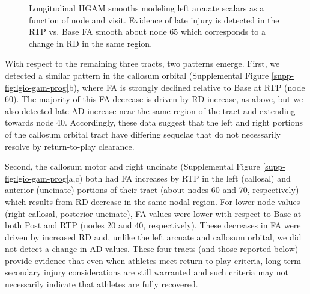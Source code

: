 \documentclass[12pt]{article}
\begin{document}
\begin{figure}[H]
	\centering
	\caption{Longitudinal HGAM smooths modeling left arcuate scalars as a function of node and visit. Evidence of late injury is detected in the RTP vs. Base FA smooth about node 65 which corresponds to a change in RD in the same region.}
	\label{fig:lgio-gam-prog}
\end{figure}

With respect to the remaining three tracts, two patterns emerge. First, we detected a similar pattern in the callosum orbital (Supplemental Figure \ref{supp-fig:lgio-gam-prog}b), where FA is strongly declined relative to Base at RTP (node 60). The majority of this FA decrease is driven by RD increase, as above, but we also detected late AD increase near the same region of the tract and extending towards node 40. Accordingly, these data suggest that the left and right portions of the callosum orbital tract have differing sequelae that do not necessarily resolve by return-to-play clearance.

Second, the callosum motor and right uncinate (Supplemental Figure \ref{supp-fig:lgio-gam-prog}a,c) both had FA increases by RTP in the left (callosal) and anterior (uncinate) portions of their tract (about nodes 60 and 70, respectively) which results from RD decrease in the same nodal region. For lower node values (right callosal, posterior uncinate), FA values were lower with respect to Base at both Post and RTP (nodes 20 and 40, respectively). These decreases in FA were driven by increased RD and, unlike the left arcuate and callosum orbital, we did not detect a change in AD values. These four tracts (and those reported below) provide evidence that even when athletes meet return-to-play criteria, long-term secondary injury considerations are still warranted and such criteria may not necessarily indicate that athletes are fully recovered.
\end{document}
